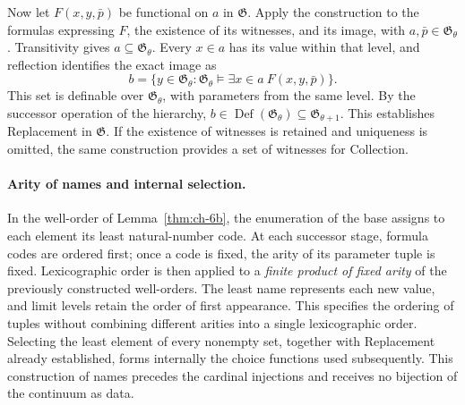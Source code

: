 Now let \(F(x,y,\bar p)\) be functional on \(a\) in \(\mathfrak G\).
Apply the construction to the formulas expressing \(F\), the existence
of its witnesses, and its image, with \(a,\bar p\in\mathfrak G_\theta\).
Transitivity gives \(a\subseteq\mathfrak G_\theta\). Every
\(x\in a\) has its value within that level, and reflection identifies
the exact image as
\[
 b=\{y\in\mathfrak G_\theta:
       \mathfrak G_\theta\models
       \exists x\in a\ F(x,y,\bar p)\}.
\]
This set is definable over \(\mathfrak G_\theta\), with parameters from
the same level. By the successor operation of the hierarchy,
\(b\in\operatorname{Def}(\mathfrak G_\theta)
\subseteq\mathfrak G_{\theta+1}\). This establishes Replacement in
\(\mathfrak G\). If the existence of witnesses is retained and uniqueness
is omitted, the same construction provides a set of witnesses for Collection.

\paragraph{Arity of names and internal selection.}
In the well-order of Lemma~\ref{thm:ch-6b}, the enumeration of the base
assigns to each element its least natural-number code. At each successor
stage, formula codes are ordered first; once a code is fixed, the arity
of its parameter tuple is fixed. Lexicographic order is then applied to a
\emph{finite product of fixed arity} of the previously constructed
well-orders. The least name represents each new value, and limit levels
retain the order of first appearance. This specifies the ordering of
tuples without combining different arities into a single lexicographic
order. Selecting the least element of every nonempty set, together with
Replacement already established, forms internally the choice functions
used subsequently. This construction of names precedes the cardinal
injections and receives no bijection of the continuum as data.
